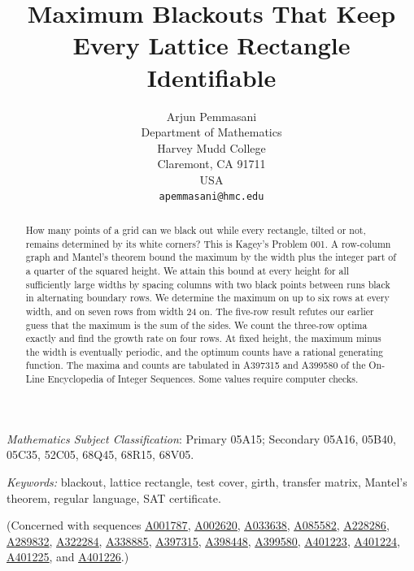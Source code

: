 \documentclass[12pt]{article}
\title{Maximum Blackouts That Keep Every Lattice Rectangle Identifiable}
\author{Arjun Pemmasani\\
Department of Mathematics\\
Harvey Mudd College\\
Claremont, CA 91711\\
USA\\
\texttt{apemmasani@hmc.edu}}
\date{}
\theoremstyle{plain}
\theoremstyle{definition}
\theoremstyle{remark}
\newcommand{\seqnum}[1]{\href{https://oeis.org/#1}{\rm \underline{#1}}}
\begin{document}
\maketitle

\begin{abstract}
How many points of a grid can we black out while every rectangle, tilted or not,
remains determined by its white corners? This is Kagey's Problem 001. A row-column
graph and Mantel's theorem bound the maximum by the width plus the integer part
of a quarter of the squared height. We attain this bound at every height for all
sufficiently large widths by spacing columns with two black points between runs
black in alternating boundary rows. We determine
the maximum on up to six rows at every width, and on seven rows from width 24 on.
The five-row result refutes our earlier guess that the maximum is the sum of the
sides. We count the three-row optima exactly and find the growth rate on four rows.
At fixed height, the maximum minus the width is eventually periodic, and the
optimum counts have a rational generating function. The maxima and counts are
tabulated in A397315 and A399580 of the On-Line Encyclopedia of Integer Sequences.
Some values require computer checks.
\end{abstract}



















 {\it Mathematics Subject Classification}: Primary 05A15; Secondary
05A16, 05B40, 05C35, 52C05, 68Q45, 68R15, 68V05.

\noindent \emph{Keywords:} blackout, lattice rectangle, test cover, girth, transfer
matrix, Mantel's theorem, regular language, SAT certificate.

\noindent (Concerned with sequences
\seqnum{A001787},
\seqnum{A002620},
\seqnum{A033638},
\seqnum{A085582},
\seqnum{A228286},
\seqnum{A289832},
\seqnum{A322284},
\seqnum{A338885},
\seqnum{A397315},
\seqnum{A398448},
\seqnum{A399580},
\seqnum{A401223},
\seqnum{A401224},
\seqnum{A401225}, and
\seqnum{A401226}.)
\end{document}
